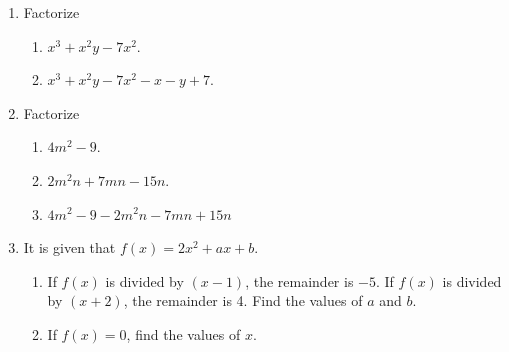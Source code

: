 \documentclass[11pt]{article}
\begin{document}
\begin{enumerate}
            \hrulefill
            
            \hrulefill

        \pagebreak
        \item Factorize\begin{enumerate}
            \item $x^3+x^2y-7x^2$.
            \item $x^3+x^2y-7x^2-x-y+7$.
        \end{enumerate}
        \hrulefill
            
            \hrulefill
            
            \hrulefill
            
            \hrulefill
            
            \hrulefill
            
            \hrulefill
            
            \hrulefill
            
            \hrulefill
            
            \hrulefill
            
            \hrulefill
            
            \hrulefill

        \item Factorize\begin{enumerate}
            \item $4m^2-9$.
            \item $2m^2n+7mn-15n$.
            \item $4m^2-9-2m^2n-7mn+15n$
        \end{enumerate}
        \hrulefill
            
            \hrulefill
            
            \hrulefill
            
            \hrulefill
            
            \hrulefill
            
            \hrulefill
            
            \hrulefill
            
            \hrulefill
            
            \hrulefill
            
            \hrulefill
            
            \hrulefill

        \pagebreak
        \item It is given that $f(x)=2x^2+ax+b$.\begin{enumerate}
            \item If $f(x)$ is divided by $(x-1)$, the remainder is $-5$. If $f(x)$ is divided by $(x+2)$, the remainder is 4. Find the values of $a$ and $b$.
            \item If $f(x)=0$, find the values of $x$.
        \end{enumerate}
        \hrulefill
            

\end{enumerate}
\end{document}
